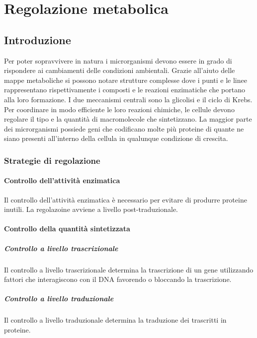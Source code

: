 \chapter{Regolazione metabolica}

\section{Introduzione}
Per poter sopravvivere in natura i microrganismi devono essere in grado di rispondere ai cambiamenti delle condizioni ambientali. 
Grazie all'aiuto delle mappe metaboliche si possono notare strutture complesse dove i punti e le linee rappresentano rispettivamente i composti e le reazioni enzimatiche che portano alla loro formazione. 
I due meccanismi centrali sono la glicolisi e il ciclo di Krebs. 
Per coordinare in modo efficiente le loro reazioni chimiche, le cellule devono regolare il tipo e la quantità di macromolecole che sintetizzano. 
La maggior parte dei microrganismi possiede geni che codificano molte più proteine di quante ne siano presenti all'interno della cellula in qualunque condizione di crescita. 
	
	\subsection{Strategie di regolazione}

		\subsubsection{Controllo dell'attivit\`a enzimatica}
		Il controllo dell'attivit\`a enzimatica \`e necessario per evitare di produrre proteine inutili.
		La regolazoine avviene a livello post-traduzionale.

		\subsubsection{Controllo della quantit\`a sintetizzata}
		
			\paragraph{Controllo a livello trascrizionale}
			Il controllo a livello trascrizionale determina la trascrizione di un gene utilizzando fattori che interagiscono con il DNA favorendo o bloccando la trascrizione.

			\paragraph{Controllo a livello traduzionale}
			Il controllo a livello traduzionale determina la traduzione dei trascritti in proteine.

